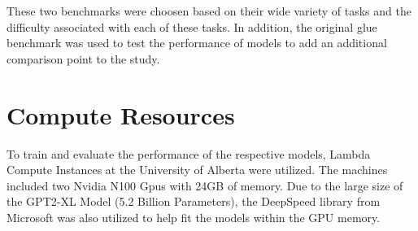 \documentclass[\main/thesis.tex]{subfiles}
\begin{document}
These two benchmarks were choosen based on their wide variety of tasks and the difficulty 
associated with each of these tasks. In addition, the original glue benchmark was used to test the performance of 
models to add an additional comparison point to the study. 


\section{Compute Resources}\label{sec:computeResources}
To train and evaluate the performance of the respective models, Lambda Compute Instances at the University of Alberta 
were utilized. The machines included two Nvidia N100 Gpus with 24GB of memory. Due to the large size of the GPT2-XL 
Model (5.2 Billion Parameters), the DeepSpeed\cite{rajbhandari_zero_2020} library from Microsoft was also utilized to 
help fit the models within the GPU memory. 
\end{document}
